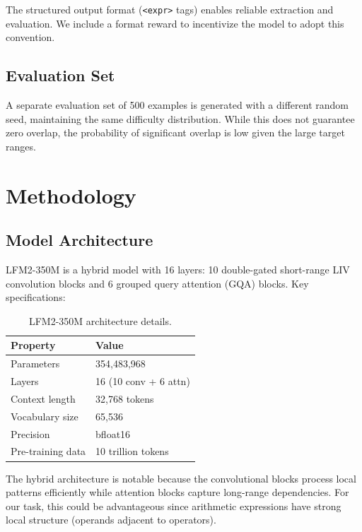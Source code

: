 \documentclass[11pt, letterpaper]{article}
\begin{document}
The structured output format (\texttt{<expr>} tags) enables reliable extraction and evaluation. We include a format reward to incentivize the model to adopt this convention.

\subsection{Evaluation Set}

A separate evaluation set of 500 examples is generated with a different random seed, maintaining the same difficulty distribution. While this does not guarantee zero overlap, the probability of significant overlap is low given the large target ranges.

\section{Methodology}
\label{sec:method}

\subsection{Model Architecture}

LFM2-350M \cite{lfm2} is a hybrid model with 16 layers: 10 double-gated short-range LIV convolution blocks and 6 grouped query attention (GQA) blocks. Key specifications:

\begin{table}[H]
\centering
\caption{LFM2-350M architecture details.}
\begin{tabular}{ll}
\toprule
\textbf{Property} & \textbf{Value} \\
\midrule
Parameters & 354,483,968 \\
Layers & 16 (10 conv + 6 attn) \\
Context length & 32,768 tokens \\
Vocabulary size & 65,536 \\
Precision & bfloat16 \\
Pre-training data & 10 trillion tokens \\
\bottomrule
\end{tabular}
\end{table}

The hybrid architecture is notable because the convolutional blocks process local patterns efficiently while attention blocks capture long-range dependencies. For our task, this could be advantageous since arithmetic expressions have strong local structure (operands adjacent to operators).
\end{document}
